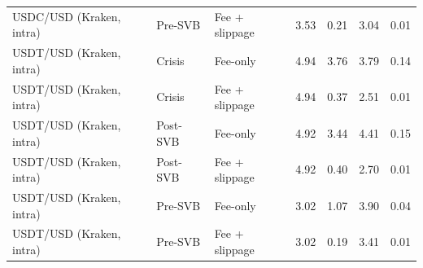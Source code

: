 \begin{table}[H]
{\begin{tabular}{lllrrrr}
USDC/USD (Kraken, intra) & Pre-SVB & Fee + slippage & 3.53 & 0.21 & 3.04 & 0.01 \\
USDT/USD (Kraken, intra) & Crisis & Fee-only & 4.94 & 3.76 & 3.79 & 0.14 \\
USDT/USD (Kraken, intra) & Crisis & Fee + slippage & 4.94 & 0.37 & 2.51 & 0.01 \\
USDT/USD (Kraken, intra) & Post-SVB & Fee-only & 4.92 & 3.44 & 4.41 & 0.15 \\
USDT/USD (Kraken, intra) & Post-SVB & Fee + slippage & 4.92 & 0.40 & 2.70 & 0.01 \\
USDT/USD (Kraken, intra) & Pre-SVB & Fee-only & 3.02 & 1.07 & 3.90 & 0.04 \\
USDT/USD (Kraken, intra) & Pre-SVB & Fee + slippage & 3.02 & 0.19 & 3.41 & 0.01 \\
\bottomrule
\end{tabular}%
}
\end{table}
